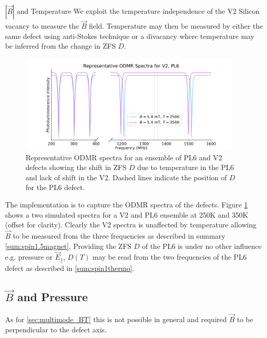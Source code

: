 \begin{proposal}{$|\vec{B}|$ and Temperature}
	We exploit the temperature independence of the V2 Silicon vacancy to measure the $\vec{B}$ field. Temperature may then be measured by either the same defect using anti-Stokes technique or a divacancy where temperature may be inferred from the change in ZFS $D$.
\end{proposal}
\begin{figure}[h]
	\begin{center}
		\includegraphics[width=0.95\textwidth]{figures/ODMR-multimodal-s15magnet-s1T.png}
	\end{center}
	\caption{Representative ODMR spectra for an ensemble of PL6 and V2 defects showing the shift in ZFS $D$ due to temperature in the PL6 and lack of shift in the V2. Dashed lines indicate the position of $D$ for the PL6 defect. }
    \label{fig:multimode_BT}
\end{figure}
The implementation is to capture the ODMR spectra of the defects. Figure \ref{fig:multimode_BT} shows a two simulated spectra for a V2 and PL6 ensemble at 250K and 350K (offset for clarity). Clearly the V2 spectra is unaffected by temperature allowing $\vec{B}$ to be measured from the three frequencies as described in summary \ref{sum:spin1.5magnet}. Providing the ZFS $D$ of the PL6 is under no other influence e.g. pressure or $\vec{E}_\parallel$, $D(T)$ may be read from the two frequencies of the PL6 defect as described in \ref{sum:spin1thermo}.





\subsection{$\vec{B}$ and Pressure}
As for \ref{sec:multimode_BT} this is not possible in general and required $\vec{B}$ to be perpendicular to the defect axis. 


